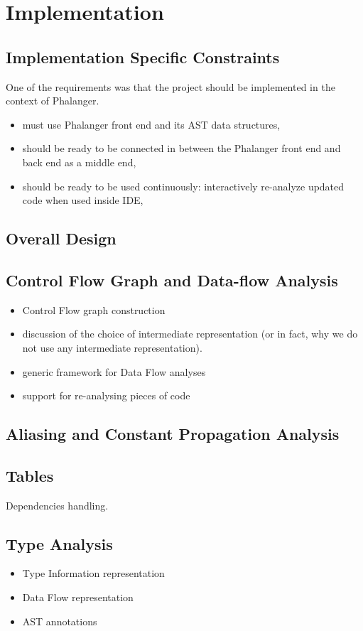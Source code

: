 \chapter{Implementation}

    \section{Implementation Specific Constraints}
    
    One of the requirements was that the project should be implemented 
    in the context of Phalanger. 
    
        \begin{itemize}
            \item must use Phalanger front end and its AST data structures,
            \item should be ready to be connected in between the Phalanger front end and back end as a middle end,
            \item should be ready to be used continuously: interactively re-analyze updated code when used inside IDE,
        \end{itemize}    
    
    \section{Overall Design}
    
    \section{Control Flow Graph and Data-flow Analysis}
        \begin{itemize}
            \item Control Flow graph construction
            \item discussion of the choice of intermediate representation (or in fact, why we do not use any intermediate representation).
            \item generic framework for Data Flow analyses
            \item support for re-analysing pieces of code
        \end{itemize}
    
    \section{Aliasing and Constant Propagation Analysis}
    
    \section{Tables}
        Dependencies handling. 
    
    \section{Type Analysis}        
        \begin{itemize}
            \item Type Information representation
            \item Data Flow representation
            \item AST annotations
        \end{itemize}
